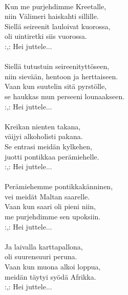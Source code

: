 \hspace{10mm} \\ Kun me purjehdimme Kreetalle, \\ niin Välimeri haiskahti sillille. \\ Siellä seireenit lauloivat kuorossa, \\ oli uintiretki siis vuorossa. \\ :,: Hei juttele... \\ \hspace{10mm} \\ Siellä tutustuin seireenityttöseen, \\ niin sievään, hentoon ja herttaiseen. \\ Vaan kun suutelin sitä pyrstölle, \\ se haukkas mun perseeni lounaakseen. \\ :,: Hei juttele... \\ \hspace{10mm} \\ Kreikan nienten takana, \\ väijyi alkoholisti pakana. \\ Se entrasi meidän kylkehen, \\ juotti pontikkaa perämiehelle. \\ :,: Hei juttele... \\ \hspace{10mm} \\ Perämiehemme pontikkakänninen, \\ vei meidät Maltan saarelle. \\ Vaan kun saari oli pieni niin, \\ me purjehdimme sen upoksiin. \\ :,: Hei juttele... \\ \hspace{10mm} \\ Ja laivalla karttapallona, \\ oli suurensuuri peruna. \\ Vaan kun muona alkoi loppua, \\ meidän täytyi syödä Afrikka. \\ :,: Hei juttele...